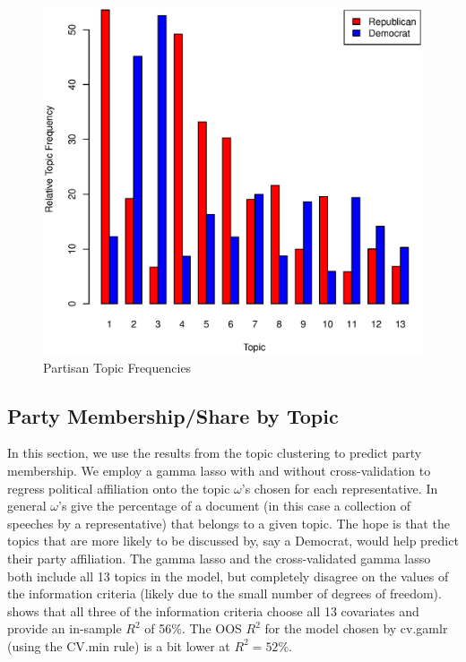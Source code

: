 \documentclass[11pt, fleqn]{article}
\begin{document}
\begin{figure}[!htb]
  \centering
  \includegraphics[scale=.5]{topic.eps}
  \caption{Partisan Topic Frequencies}
  \label{fig:topic}
\end{figure}



\subsection{Party Membership/Share by Topic}

In this section, we use the results from the topic clustering to predict party membership.  We employ a gamma lasso with and without cross-validation to regress political affiliation onto the topic $\omega$'s chosen for each representative.  In general $\omega$'s give the percentage of a document (in this case a collection of speeches by a representative) that belongs to a given topic.  The hope is that the topics that are more likely to be discussed by, say a Democrat, would help predict their party affiliation.  The gamma lasso and the cross-validated gamma lasso both include all 13 topics in the model, but completely disagree on the values of the information criteria (likely due to the small number of degrees of freedom).   shows that all three of the information criteria choose all 13 covariates and provide an in-sample $R^2$ of 56\%.  The OOS $R^2$ for the model chosen by cv.gamlr (using the CV.min rule) is a bit lower at $R^2=52\%$.
\end{document}
